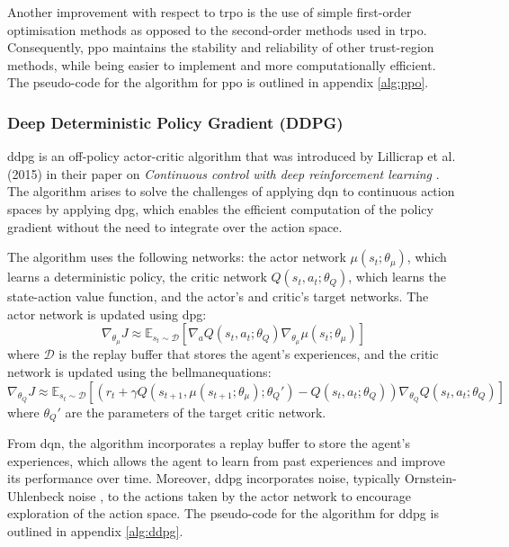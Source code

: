 Another improvement with respect to \acrshort{trpo} is the use of simple first-order optimisation methods as opposed to the second-order methods used in \acrshort{trpo}. Consequently, \acrshort{ppo} maintains the stability and reliability of other trust-region methods, while being easier to implement and more computationally efficient. The pseudo-code for the algorithm for \acrshort{ppo} is outlined in appendix \ref{alg:ppo}.

\subsubsection{Deep Deterministic Policy Gradient (DDPG)} \label{sec:ddpg}

\acrfull{ddpg} is an off-policy actor-critic algorithm that was introduced by Lillicrap et al. (2015) in their paper on \textit{Continuous control with deep reinforcement learning} \cite{Lillicrap2015}. The algorithm arises to solve the challenges of applying \acrlong{dqn} \cite{Mnih2013} to continuous action spaces by applying \acrfull{dpg}, which enables the efficient computation of the policy gradient without the need to integrate over the action space. 

The algorithm uses the following networks: the actor network $\mu(s_t; \theta_\mu)$, which learns a deterministic policy, the critic network $Q(s_t, a_t; \theta_Q)$, which learns the state-action value function, and the actor's and critic's target networks. The actor network is updated using \acrshort{dpg}: 
\begin{equation}
    \nabla_{\theta_\mu} J \approx \mathbb{E}_{s_t \sim \mathcal{D}} \left[\nabla_a Q(s_t, a_t; \theta_Q) \nabla_{\theta_\mu} \mu(s_t; \theta_\mu)\right]
\end{equation}
where $\mathcal{D}$ is the replay buffer that stores the agent's experiences, and the critic network is updated using the \Gls{bellmanequations}:
\begin{equation}
    \nabla_{\theta_Q} J \approx \mathbb{E}_{s_t \sim \mathcal{D}} \left[\left(r_t + \gamma Q(s_{t+1}, \mu(s_{t+1}; \theta_\mu); \theta_Q') - Q(s_t, a_t; \theta_Q)\right) \nabla_{\theta_Q} Q(s_t, a_t; \theta_Q)\right]
\end{equation}
where $\theta_Q'$ are the parameters of the target critic network. 

From \acrlong{dqn}, the algorithm incorporates a replay buffer to store the agent's experiences, which allows the agent to learn from past experiences and improve its performance over time. Moreover, \acrshort{ddpg} incorporates noise, typically Ornstein-Uhlenbeck noise \cite{Uhlenbeck1930}, to the actions taken by the actor network to encourage exploration of the action space. The pseudo-code for the algorithm for \acrshort{ddpg} is outlined in appendix \ref{alg:ddpg}.


